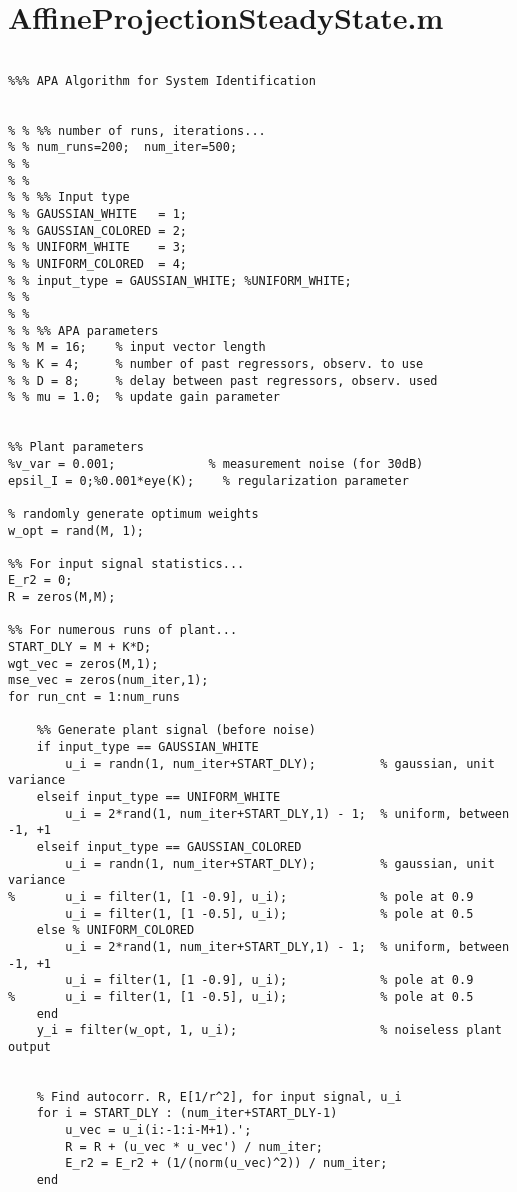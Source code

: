 \section{AffineProjectionSteadyState.m}
\begin{lstlisting}

%%% APA Algorithm for System Identification


% % %% number of runs, iterations...
% % num_runs=200;  num_iter=500;
% %
% %
% % %% Input type
% % GAUSSIAN_WHITE   = 1;
% % GAUSSIAN_COLORED = 2;
% % UNIFORM_WHITE    = 3;
% % UNIFORM_COLORED  = 4;
% % input_type = GAUSSIAN_WHITE; %UNIFORM_WHITE;
% %
% %
% % %% APA parameters
% % M = 16;    % input vector length
% % K = 4;     % number of past regressors, observ. to use
% % D = 8;     % delay between past regressors, observ. used
% % mu = 1.0;  % update gain parameter


%% Plant parameters
%v_var = 0.001;             % measurement noise (for 30dB)
epsil_I = 0;%0.001*eye(K);    % regularization parameter

% randomly generate optimum weights
w_opt = rand(M, 1);

%% For input signal statistics...
E_r2 = 0;
R = zeros(M,M);

%% For numerous runs of plant...
START_DLY = M + K*D;
wgt_vec = zeros(M,1);
mse_vec = zeros(num_iter,1);
for run_cnt = 1:num_runs

    %% Generate plant signal (before noise)
    if input_type == GAUSSIAN_WHITE
        u_i = randn(1, num_iter+START_DLY);         % gaussian, unit variance
    elseif input_type == UNIFORM_WHITE
        u_i = 2*rand(1, num_iter+START_DLY,1) - 1;  % uniform, between -1, +1
    elseif input_type == GAUSSIAN_COLORED
        u_i = randn(1, num_iter+START_DLY);         % gaussian, unit variance
%       u_i = filter(1, [1 -0.9], u_i);             % pole at 0.9
        u_i = filter(1, [1 -0.5], u_i);             % pole at 0.5
    else % UNIFORM_COLORED
        u_i = 2*rand(1, num_iter+START_DLY,1) - 1;  % uniform, between -1, +1
        u_i = filter(1, [1 -0.9], u_i);             % pole at 0.9
%       u_i = filter(1, [1 -0.5], u_i);             % pole at 0.5
    end
    y_i = filter(w_opt, 1, u_i);                    % noiseless plant output


    % Find autocorr. R, E[1/r^2], for input signal, u_i
    for i = START_DLY : (num_iter+START_DLY-1)
        u_vec = u_i(i:-1:i-M+1).';
        R = R + (u_vec * u_vec') / num_iter;
        E_r2 = E_r2 + (1/(norm(u_vec)^2)) / num_iter;
    end



\end{lstlisting}
